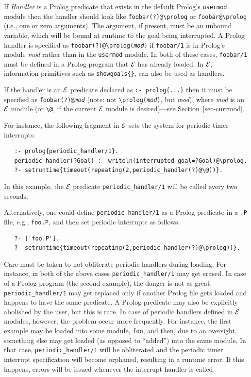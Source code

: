 \documentclass[11pt]{article}
\newcommand{\ERGO}{\mbox{\ensuremath{\cal{E}}\smaller{{\sc{RGO}}}}\xspace}
\newcommand{\FLSYSTEM}{\ERGO}
\newcommand{\bs}{\textbackslash}
\begin{document}
  If \emph{Handler} is a Prolog predicate that exists in the default
  Prolog's \texttt{usermod} module then the handler should look like
  \texttt{foobar(?)@\bs{}prolog} or \texttt{foobar@\bs{}prolog} (i.e., one or zero arguments).
  The argument, if present, must be an unbound variable, which will
  be bound at runtime to the goal being interrupted.
  A Prolog handler is specified as 
  \texttt{foobar(?)@\bs{}prolog(\emph{mod})} if 
  \texttt{foobar/1} is in Prolog's module \emph{mod} rather than in
  the \texttt{usermod} module. In both of these cases, \texttt{foobar/1} 
  must be defined in a Prolog program that \FLSYSTEM has already loaded.
  In \ERGO, information primitives such as \texttt{showgoals\{\}}, can also
  be used as handlers. 

  If the handler is an \FLSYSTEM predicate declared
  as \texttt{:- prolog\{...\}} then it must be specified as
  \texttt{foobar(?)@\emph{mod}} (note: not \texttt{\bs{}prolog(\emph{mod})}, but
  \emph{mod}), where \emph{mod} is an \FLSYSTEM module (or
  \texttt{\bs{}@}, if the current \FLSYSTEM module is desired)---see
  Section~\ref{sec-currmod}.

For instance, the following fragment in \FLSYSTEM sets the system for periodic
timer interrupts:
\begin{verbatim}
   :- prolog{periodic_handler/1}.
   periodic_handler(?Goal) :- writeln(interrupted_goal=?Goal)@\prolog.
   ?- setruntime{timeout(repeating(2,periodic_handler(?)@\@))}.
\end{verbatim}
In this example, the \FLSYSTEM predicate \texttt{periodic\_handler/1} will be
called every two seconds. 

Alternatively, one could define \texttt{periodic\_handler/1} as a Prolog
predicate in a \texttt{.P} file,
e.g., \texttt{foo.P}, and then set
periodic interrupts as follows:  
\begin{verbatim}
   ?- ['foo.P'].
   ?- setruntime{timeout(repeating(2,periodic_handler(?)@\prolog))}.
\end{verbatim}

Care must be taken to not obliterate periodic handlers
during loading. For instance, in both of the above cases
\texttt{periodic\_handler/1} may get erased. In case of a Prolog program
(the second example), the danger is not as great:
\texttt{periodic\_handler/1} may get replaced only if another Prolog file gets
loaded and happens to have the same predicate. A Prolog predicate may also
be explicitly abolished by the user, but this is rare.
In case of periodic handlers defined in \FLSYSTEM
modules, however, the problem occur more frequently. For instance, the first example may
be loaded into some module, \texttt{foo}, and then, due to an oversight,
something else may get loaded (as opposed to ``added'') into the same module.
In that case, \texttt{periodic\_handler/1} will be obliterated and the
periodic timer interrupt specification
will become orphaned, resulting in a runtime error. If this happens, errors will
be issued whenever the interrupt handler is called.
\end{document}
